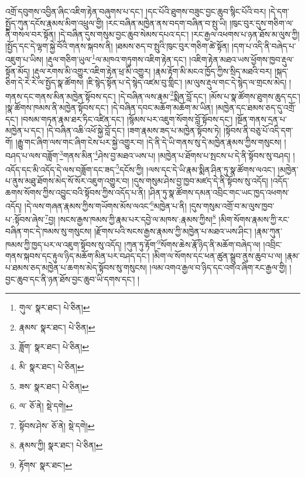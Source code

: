 འགྲོ་དབུགས་འབྱིན་ཞིང་འཇིག་རྟེན་བཞུགས་པ་དང་། །དང་པོའི་ཐུགས་བཟུང་བྱང་ཆུབ་སྙིང་པོའི་བར། །དེ་དག་སྤྱོད་ཀུན་དངོས་རྣམས་མིག་འཕྲུལ་གྱི། །རང་བཞིན་མཁྱེན་ནས་བདག་བཞིན་བ་སྤུ་ཡི། །ཁུང་བུར་དུས་གཅིག་ལ་ནི་གསལ་བར་སྟོན། །དེ་བཞིན་དུས་གསུམ་བྱང་ཆུབ་སེམས་དཔའ་དང་། །རང་རྒྱལ་འཕགས་པ་ཉན་ཐོས་མ་ལུས་ཀྱི། །སྤྱོད་དང་དེ་ལྷག་སྐྱེ་བོའི་གནས་སྐབས་ནི། །ཐམས་ཅད་བ་སྤུའི་ཁུང་བུར་གཅིག་ཚེ་སྟོན། །དག་པ་འདི་ནི་བཞེད་པ་འཇུག་པ་ཡིས། །རྡུལ་གཅིག་ཡུལ་\footnote{གུལ་  སྣར་ཐང་།  པེ་ཅིན། }ལ་མཁའ་གཏུགས་འཇིག་རྟེན་དང་། །འཇིག་རྟེན་མཐའ་ཡས་ཕྱོགས་ཁྱབ་རྡུལ་སྟོན་མོད། །རྡུལ་རགས་མི་འགྱུར་འཇིག་རྟེན་ཕྲ་མི་འགྱུར། །རྣམ་རྟོག་མི་མངའ་ཁྱོད་ཀྱིས་སྲིད་མཐའི་བར། །སྐད་ཅིག་དེ་རེ་རེ་ལ་སྤྱོད་སྣ་ཚོགས། །ཇི་སྙེད་སྟོན་པ་དེ་སྙེད་འཛམ་བུ་གླིང་། །མ་ལུས་རྡུལ་གང་དེ་སྙེད་ལ་གྲངས་མེད། །གནས་དང་གནས་མིན་མཁྱེན་སྟོབས་དང་། །དེ་བཞིན་ལས་རྣམ་\footnote{རྣམས་  སྣར་ཐང་།  པེ་ཅིན། }སྨིན་བློ་དང་། །མོས་པ་སྣ་ཚོགས་ཐུགས་ཆུད་དང་། །སྣ་ཚོགས་ཁམས་ནི་མཁྱེན་སྟོབས་དང་། །དེ་བཞིན་དབང་མཆོག་མཆོག་མ་ཡིན། །མཁྱེན་དང་ཐམས་ཅད་དུ་འགྲོ་དང་། །བསམ་གཏན་རྣམ་ཐར་ཏིང་འཛིན་དང་། །སྙོམས་པར་འཇུག་སོགས་བློ་སྟོབས་དང་། །སྔོན་གནས་དྲན་པ་མཁྱེན་པ་དང་། །དེ་བཞིན་འཆི་འཕོ་སྐྱེ་བློ་དང་། །ཟག་རྣམས་ཟད་པ་མཁྱེན་སྟོབས་ཏེ། །སྟོབས་ནི་བཅུ་པོ་འདི་དག་གོ། །རྒྱུ་གང་ཞིག་ལས་གང་ཞིག་ངེས་པར་སྐྱེ་འགྱུར་བ། །དེ་ནི་དེ་ཡི་གནས་སུ་དེ་མཁྱེན་རྣམས་ཀྱིས་གསུངས། །བཤད་པ་ལས་བཟློག་\footnote{ཟློག་  སྣར་ཐང་།  པེ་ཅིན། }གནས་མིན་\footnote{མི་  སྣར་ཐང་།  པེ་ཅིན། }ཤེས་བྱ་མཐའ་ཡས་པ། །མཁྱེན་པ་ཐོགས་པ་སྤངས་པ་དེ་ནི་སྟོབས་སུ་བཤད། །འདོད་དང་མི་འདོད་དེ་ལས་བཟློག་དང་ཟད་\footnote{ཟས་  སྣར་ཐང་།  པེ་ཅིན། }དངོས་ཀྱི། །ལས་དང་དེ་ཡི་རྣམ་སྨིན་ཤིན་ཏུ་སྣ་ཚོགས་ལའང་། །མཁྱེན་པ་ནུས་མཐུ་ཐོགས་མེད་སོ་སོར་འཇུག་འགྱུར་བ། །དུས་གསུམ་ཤེས་བྱ་ཁྱབ་མཛད་དེ་ནི་སྟོབས་སུ་འདོད། །འདོད་ཆགས་སོགས་ཀྱིས་འབྱུང་བའི་སྟོབས་ཀྱིས་འདོད་པ་ནི། །ཤིན་ཏུ་སྣ་ཚོགས་དམན་འབྲིང་གང་ཡང་ཁྱད་འཕགས་འདོད། །དེ་ལས་གཞན་རྣམས་ཀྱིས་གཡོགས་མོས་ལའང་\footnote{ལ་  ཅོ་ནེ།  སྡེ་དགེ། }མཁྱེན་པ་ནི། །དུས་གསུམ་འགྲོ་བ་མ་ལུས་ཁྱབ་པ་:སྟོབས་ཞེས་\footnote{སྟོབས་ཤེས་  ཅོ་ནེ།  སྡེ་དགེ། }བྱ། །སངས་རྒྱས་ཁམས་ཀྱི་རྣམ་པར་དབྱེ་ལ་མཁས་:རྣམས་ཀྱིས།\footnote{རྣམས་ཀྱི།  སྣར་ཐང་།  པེ་ཅིན། } །མིག་སོགས་རྣམས་ཀྱི་རང་བཞིན་གང་དེ་ཁམས་སུ་གསུངས། །རྫོགས་པའི་སངས་རྒྱས་རྣམས་ཀྱི་མཁྱེན་པ་མཐའ་ཡས་ཤིང་། །རྣམ་ཀུན་ཁམས་ཀྱི་ཁྱད་པར་ལ་འཇུག་སྟོབས་སུ་འདོད། །ཀུན་ཏུ་རྟོག་\footnote{རྟོགས་  སྣར་ཐང་། }སོགས་ཆེས་རྣོ་ཉིད་ནི་མཆོག་བཞེད་ལ། །འབྲིང་གནས་སྐབས་དང་རྟུལ་ཉིད་མཆོག་མིན་པར་བཤད་དང་། །མིག་ལ་སོགས་དང་ཕན་ཚུན་སྒྲུབ་ནུས་ཆུབ་པ་ལ། །རྣམ་པ་ཐམས་ཅད་མཁྱེན་པ་ཆགས་མེད་སྟོབས་སུ་གསུངས། །ལམ་འགའ་རྒྱལ་བ་ཉིད་དང་འགའ་ཞིག་རང་རྒྱལ་གྱི། །བྱང་ཆུབ་དང་ནི་ཉན་ཐོས་བྱང་ཆུབ་ཡི་དགས་དང་། །
